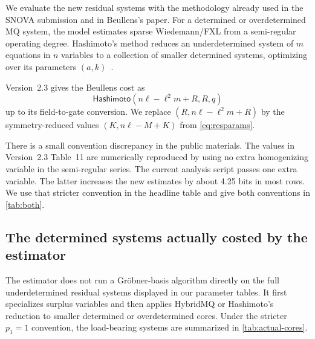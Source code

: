 \documentclass[runningheads]{llncs}
\newcommand{\Hashimoto}{\mathsf{Hashimoto}}
\newcommand{\SNOVA}{\textsf{SNOVA}}
\begin{document}
We evaluate the new residual systems with the methodology already used in the \SNOVA{} submission and in Beullens's paper.  For a determined or overdetermined MQ system, the model estimates sparse Wiedemann/FXL from a semi-regular operating degree.  Hashimoto's method reduces an underdetermined system of $m$ equations in $n$ variables to a collection of smaller determined systems, optimizing over its parameters $(a,k)$~\cite{Hashimoto2023,Beullens2024SNOVA}.

Version~2.3 gives the Beullens cost as
\[
 \Hashimoto(n\ell-\ell^2m+R,R,q)
\]
up to its field-to-gate conversion.  We replace $(R,n\ell-\ell^2m+R)$ by the symmetry-reduced values $(K,n\ell-M+K)$ from \cref{eq:resparams}.

There is a small convention discrepancy in the public materials.  The values in Version~2.3 Table~11 are numerically reproduced by using no extra homogenizing variable in the semi-regular series.  The current analysis script passes one extra variable.  The latter increases the new estimates by about 4.25 bits in most rows.  We use that stricter convention in the headline table and give both conventions in \cref{tab:both}.

\subsection{The determined systems actually costed by the estimator}
\label{sec:actual-cores}

The estimator does not run a Gr\"obner-basis algorithm directly on the full
underdetermined residual systems displayed in our parameter tables.  It first
specializes surplus variables and then applies HybridMQ or Hashimoto's
reduction to smaller determined or overdetermined cores.  Under the stricter
$p_1=1$ convention, the load-bearing systems are summarized in
\cref{tab:actual-cores}.
\end{document}
